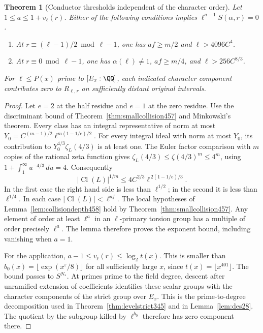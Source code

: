 \documentclass[a4paper,11pt]{article}
\newtheorem{theorem}[proposition]{Theorem}
\theoremstyle{definition}
\theoremstyle{remark}
\numberwithin{equation}{section}
\newcommand{\Cl}{\operatorname{Cl}}
\begin{document}
\begin{theorem}[Conductor thresholds independent of the character order]\leavevmode
\label{thm:uniformdepth458}
Let \(1\le a\le1+v_\ell(r)\). Either of the following conditions
implies \(\ell^{a-1}S(\alpha,r)=0\).
\begin{enumerate}
\item At \(r\equiv(\ell-1)/2\bmod{\ell-1}\), one has
      \(af\ge m/2\) and \(\ell>4096C^4\).
\item At \(r\equiv0\bmod{\ell-1}\), one has
      \(\alpha(\ell)\ne1\), \(af\ge m/4\), and
      \(\ell>256 C^{8/3}\).
\end{enumerate}
For \(\ell\le P(x)\) prime to \([E_x:\QQ]\), each indicated
character component contributes zero to \(R_{\ell,r}\) on
sufficiently distant original intervals.
\end{theorem}
\begin{proof}
Let \(e=2\) at the half residue and \(e=1\) at the zero residue.
Use the discriminant bound of Theorem~\ref{thm:smallcollision457}
and Minkowski's theorem. Every class has an integral representative
of norm at most
\(Y_0=C^{(m-1)/2}\ell^{m(1-1/e)/2}\).
For every integral ideal with norm at most \(Y_0\), its
contribution to \(Y_0^{4/3}\zeta_L(4/3)\) is at least one.
The Euler factor comparison with \(m\) copies of the rational
zeta function gives \(\zeta_L(4/3)\le\zeta(4/3)^m\le4^m\),
using \(1+\int_1^\infty u^{-4/3}\,du=4\). Consequently
\[
          |\Cl(L)|^{1/m}
             \le 4 C^{2/3}\ell^{\,2(1-1/e)/3}.
\]
In the first case the right hand side is less than \(\ell^{1/2}\);
in the second it is less than \(\ell^{1/4}\). In each case
\(|\Cl(L)|<\ell^{af}\). The local hypotheses of
Lemma~\ref{lem:collisiondepth458} hold by
Theorem~\ref{thm:smallcollision457}. Any element of order at
least \(\ell^a\) in an \(\ell\)-primary torsion group has a
multiple of order precisely \(\ell^a\). The lemma therefore
proves the exponent bound, including vanishing when \(a=1\).

For the application, \(a-1\le v_\ell(r)\le\log_2 t(x)\).
This is smaller than \(b_0(x)=\lfloor\exp(x^\varepsilon/8)\rfloor\)
for all sufficiently large \(x\), since \(t(x)=\lfloor x^{401}\rfloor\).
The bound passes to \(S^{N_*}\). At primes prime to the field
degree, descent after unramified extension of coefficients
identifies these scalar groups with the character components
of the strict group over \(E_x\). This is the prime-to-degree
decomposition used in Theorem~\ref{thm:levelstrict345} and in
Lemma~\ref{lem:des28}. The quotient by the subgroup killed by
\(\ell^{b_0}\) therefore has zero component there.
\end{proof}
\end{document}
